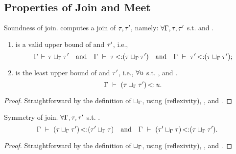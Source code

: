 \subsection{Properties of Join and Meet}%
\label{subsec:props-join-meet-proof}

\begin{theorem}{Soundness of join.}%
\label{thm:join-sound}
     computes a join of $\tau, \tau'$, namely:
    $\forall \Gamma, \tau, \tau'$ s.t. \tyvld{}{\AEnv}
    and .
    \begin{enumerate}
        \item {} is a valid upper bound
            of \ty and $\tau'$, i.e., 
            \[
                \Gamma\,\vdash\,\tau \sqcup_{\Gamma} \tau'
                \quad\text{and}\quad
                \Gamma\ \vdash\ \tau \operatorname{<:} (\tau \sqcup_{\Gamma} \tau')
                \quad\text{and}\quad
                \Gamma\ \vdash\ \tau' \operatorname{<:} (\tau \sqcup_{\Gamma} \tau');
            \]
        \item {} is the least upper bound
            of \ty and $\tau'$, i.e.,
            $\forall u$ s.t. \tyvlddflt{\tyub},
            \subtydflt{\ty}{\tyub} and .
            \[
                \Gamma\ \vdash\ (\tau \sqcup_{\Gamma} \tau') \operatorname{<:} u.
            \]
    \end{enumerate}
\end{theorem}
\begin{proof}
    Straightforward by the definition of $\sqcup_{\Gamma}$,
    using  (reflexivity), 
    , and .
\end{proof}

\begin{lemma}{Symmetry of join.}
    $\forall \Gamma, \tau, \tau'$ s.t. .
    \[
        \Gamma\ \vdash\ (\tau \sqcup_{\Gamma} \tau') \operatorname{<:} (\tau' \sqcup_{\Gamma} \tau)
        \quad\text{and}\quad
        \Gamma\ \vdash\ (\tau' \sqcup_{\Gamma} \tau) \operatorname{<:} (\tau \sqcup_{\Gamma} \tau').
    \]
\end{lemma}
\begin{proof}
    Straightforward by the definition of $\sqcup_{\Gamma}$,
    using  (reflexivity), 
    , and .
\end{proof}

